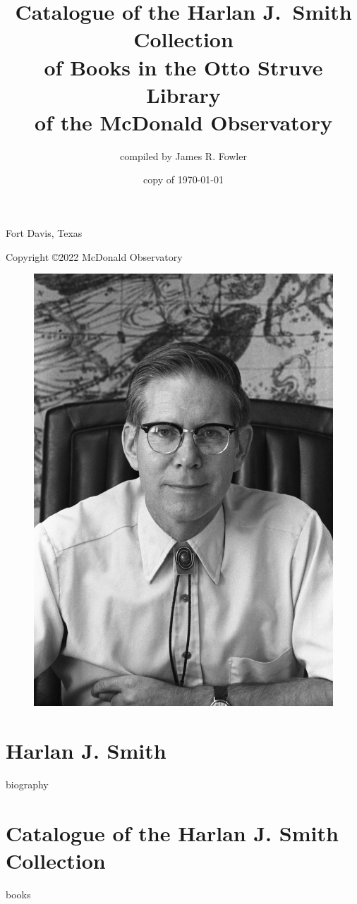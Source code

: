 \documentclass{article}%
\begin{document}
\title{Catalogue of the Harlan J.~Smith Collection \\
  of Books in the Otto Struve Library \\
  of the McDonald Observatory}
\author{compiled by James R. Fowler}
\date{copy of \today}
\maketitle

\newpage

\vspace*{7 in}
\centerline{Fort Davis, Texas}
\centerline{Copyright \copyright 2022 McDonald Observatory}

\begin{figure}
  \includegraphics{hjs_photo.jpg}
  \label{fig:hjs}
\end{figure}
  
\newpage
\hbox{\hfil}
\newpage

\section*{Harlan J. Smith}
{biography}

\newpage

\section*{Catalogue of the Harlan J. Smith Collection}

{books}
\end{document}
